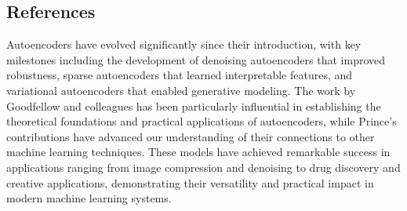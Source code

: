 

\subsection{References}

Autoencoders have evolved significantly since their introduction, with key milestones including the development of denoising autoencoders that improved robustness, sparse autoencoders that learned interpretable features, and variational autoencoders that enabled generative modeling. The work by Goodfellow and colleagues has been particularly influential in establishing the theoretical foundations and practical applications of autoencoders, while Prince's contributions have advanced our understanding of their connections to other machine learning techniques. These models have achieved remarkable success in applications ranging from image compression and denoising to drug discovery and creative applications, demonstrating their versatility and practical impact in modern machine learning systems.
